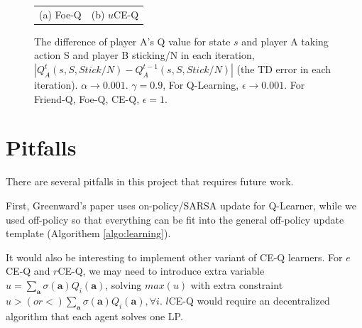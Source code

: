 \documentclass[conference]{IEEEtran}
\begin{document}
\begin{figure}[h!]
\begin{tabular}{cc}
		(a) Foe-Q & (b) $u$CE-Q \\
	\end{tabular}
	\caption{The difference of player A's Q value for state $s$ and player A taking action S and player B sticking/N in each iteration, $|Q_A^t(s, S, Stick/N) - Q_A^{t-1}(s, S, Stick/N)|$ (the TD error in each iteration). $\alpha\rightarrow0.001$. $\gamma=0.9$, For Q-Learning, $\epsilon\rightarrow0.001$. For Friend-Q, Foe-Q, CE-Q, $\epsilon=1$. }
	\label{fig:results}
\end{figure}

\section{Pitfalls}
There are several pitfalls in this project that requires future work.

First, Greenward's paper uses on-policy/SARSA update for Q-Learner, while we used off-policy so that everything can be fit into the general off-policy update template  (Algorithem \ref{algo:learning}).

It would also be interesting to implement other variant of CE-Q learners. For $e$CE-Q and $r$CE-Q, we may need to introduce extra variable $u=\sum_{\mathbf{a}}\sigma(\mathbf{a}) Q_i(\mathbf{a})$, solving $max(u)$ with extra constraint $u>(or <) \sum_{\mathbf{a}}\sigma(\mathbf{a}) Q_i(\mathbf{a}), \forall i$. $l$CE-Q would require an decentralized algorithm that each agent solves one LP.

	


\end{document}
